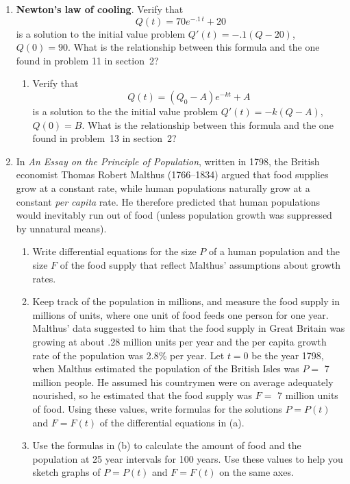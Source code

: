 \begin{enumerate}
\item {\bf Newton's law of cooling}.  Verify that
	\[
Q(t)=70e^{-.1\,t} + 20
\]
is a solution to the initial value problem $Q'(t) = -.1(Q-20)$, $Q(0) = 90$.  What is the relationship between this formula and the one found in problem 11 in section~2?

  \begin{enumerate}
  \item Verify that
\[
Q(t)=(Q_0-A)e^{-kt} + A
\]
is a solution to the the initial value problem $Q'(t)=-k(Q-A)$,
\mbox{$Q(0)=B$}.  What is the relationship between this formula and the one
found in problem~13 in section~2?



\end{enumerate}
\item In {\em An Essay on the Principle of Population}, written in
1798, the British economist Thomas Robert Malthus
(1766--1834) argued that food supplies grow at a
constant rate, while human populations naturally grow at a constant
{\em per capita} rate.  He therefore predicted that human populations
would inevitably run out of food (unless population growth was
suppressed by unnatural means).

  \begin{enumerate}
  \item Write differential equations for the size $P$ of a human
population and the size $F$ of the food supply that reflect Malthus'
assumptions about growth rates.

  \item Keep track of the population in millions, and measure the food
supply in millions of units, where one unit of food feeds one person
for one year.  Malthus' data suggested to him that the food supply in
Great Britain was growing at about .28 million units per year and the
per capita growth rate of the population was 2.8\% per year.  Let
$t=0$ be the year 1798, when Malthus estimated the population of the
British Isles was $P=$ 7 million people.  He assumed his countrymen
were on average adequately nourished, so he estimated that the food
supply was $F=$ 7 million units of food.  Using these values, write
formulas for the solutions $P=P(t)$ and $F=F(t)$ of the differential
equations in (a).

  \item Use the formulas in (b) to calculate the amount of food and the
population at 25 year intervals for 100 years.  Use these values to
help you sketch graphs of $P=P(t)$ and $F=F(t)$ on the same axes.


\end{enumerate}
\end{enumerate}
